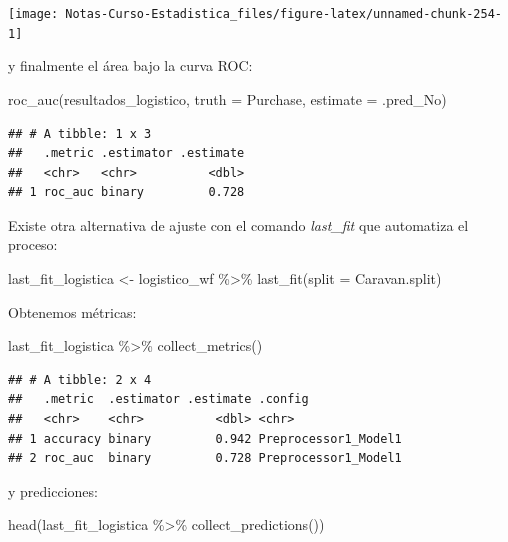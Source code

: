 \documentclass[
  12pt,
]{book}
\newenvironment{Shaded}{\begin{snugshade}}{\end{snugshade}}
\newcommand{\AttributeTok}[1]{\textcolor[rgb]{0.77,0.63,0.00}{#1}}
\newcommand{\FunctionTok}[1]{\textcolor[rgb]{0.00,0.00,0.00}{#1}}
\newcommand{\NormalTok}[1]{#1}
\newcommand{\OtherTok}[1]{\textcolor[rgb]{0.56,0.35,0.01}{#1}}
\newcommand{\SpecialCharTok}[1]{\textcolor[rgb]{0.00,0.00,0.00}{#1}}
\begin{document}
\begin{center}\texttt{[image: Notas-Curso-Estadistica\_files/figure-latex/unnamed-chunk-254-1]} \end{center}

y finalmente el área bajo la curva ROC:

\begin{Shaded}
\begin{Highlighting}[]
\FunctionTok{roc\_auc}\NormalTok{(resultados\_logistico, }\AttributeTok{truth =}\NormalTok{ Purchase, }\AttributeTok{estimate =}\NormalTok{ .pred\_No)}
\end{Highlighting}
\end{Shaded}

\begin{verbatim}
## # A tibble: 1 x 3
##   .metric .estimator .estimate
##   <chr>   <chr>          <dbl>
## 1 roc_auc binary         0.728
\end{verbatim}

Existe otra alternativa de ajuste con el comando \emph{last\_fit} que
automatiza el proceso:

\begin{Shaded}
\begin{Highlighting}[]
\NormalTok{last\_fit\_logistica }\OtherTok{\textless{}{-}}\NormalTok{ logistico\_wf }\SpecialCharTok{\%\textgreater{}\%}
    \FunctionTok{last\_fit}\NormalTok{(}\AttributeTok{split =}\NormalTok{ Caravan.split)}
\end{Highlighting}
\end{Shaded}

Obtenemos métricas:

\begin{Shaded}
\begin{Highlighting}[]
\NormalTok{last\_fit\_logistica }\SpecialCharTok{\%\textgreater{}\%}
    \FunctionTok{collect\_metrics}\NormalTok{()}
\end{Highlighting}
\end{Shaded}

\begin{verbatim}
## # A tibble: 2 x 4
##   .metric  .estimator .estimate .config             
##   <chr>    <chr>          <dbl> <chr>               
## 1 accuracy binary         0.942 Preprocessor1_Model1
## 2 roc_auc  binary         0.728 Preprocessor1_Model1
\end{verbatim}

y predicciones:

\begin{Shaded}
\begin{Highlighting}[]
\FunctionTok{head}\NormalTok{(last\_fit\_logistica }\SpecialCharTok{\%\textgreater{}\%}
    \FunctionTok{collect\_predictions}\NormalTok{())}
\end{Highlighting}
\end{Shaded}
\end{document}
